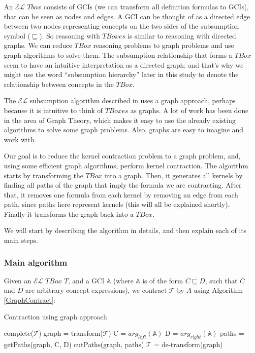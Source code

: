 An $\mathcal{EL}$ $Tbox$ consists of GCIs (we can transform all definition formulas to GCIs), that can be seen as nodes and edges. A GCI can be thought of as a directed edge between two nodes representing concepts on the two sides of the subsumption symbol ($\sqsubseteq$). So reasoning with $TBoxes$ is similar to reasoning with directed graphs. We can reduce $TBox$ reasoning problems to graph problems and use graph algorithms to solve them. The subsumption relationship that forms a $TBox$ seem to have an intuitive interpretation as a directed graph; and that's why we might use the word ``subsumption hierarchy'' later in this study to denote the relationship between concepts in the $TBox$.

The $\mathcal{EL}$ subsumption algorithm described in \cite{small} uses a graph approach, perhaps because it is intuitive to think of $TBoxes$ as graphs. A lot of work has been done in the area of Graph Theory, which makes it easy to use the already existing algorithms to solve some graph problems. Also, graphs are easy to imagine and work with. 

Our goal is to reduce the kernel contraction problem to a graph problem, and, using some efficient graph algorithms, perform kernel contraction. The algorithm starts by transforming the $TBox$ into a graph. Then, it generates all kernels by finding all paths of the graph that imply the formula we are contracting. After that, it removes one formula from each kernel by removing an edge from each path, since paths here represent kernels (this will all be explained shortly). Finally it transforms the graph back into a $TBox$. 

We will start by describing the algorithm in details, and then explain each of its main steps. 

\subsubsection{Main algorithm}
Given an $\mathcal{EL}$ $TBox$ $T$, and a GCI $\mathbb{A}$ (where $\mathbb{A}$ is of the form $C \sqsubseteq D$, such that $C$ and $D$ are arbitrary concept expressions), we contract $\mathcal{T}$ by $A$ using Algorithm \ref{GraphContract}:


\begin{algorithm}
\caption{Contraction using graph approach}
\label{GraphContract}
\begin{algorithmic}[1]
\State complete($ \mathcal{T} $)
\State graph = transform($ \mathcal{T} $)
\State C = $arg_{left}(\mathbb{A})$
\State D = $arg_{right}(\mathbb{A})$
\State paths = getPaths(graph, C, D)
\State cutPaths(graph, paths)
\State $ \mathcal{T} $ = de-transform(graph)
\EndFunction
\end{algorithmic}
\end{algorithm}

